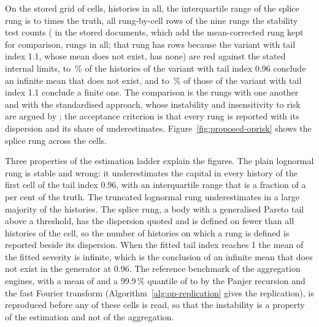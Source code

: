 On the stored grid of \pxTwelveCells{} cells, \pxTwelveHistories{} histories in all, the interquartile range of the splice rung is \pxTwelveIqrMin{} to \pxTwelveIqrMax{} times the truth, all \pxPpTwelveRed{} rung-by-cell rows of the nine rungs the stability test counts (\pxTwelveRedRows{} in the stored documents, which add the mean-corrected rung kept for comparison, \pxTwelveRungs{} rungs in all; that rung has \pxTwelveMeanCorrRows{} rows because the variant with tail index 1.1, whose mean does not exist, has none) are
red against the stated internal limits, \pxTwelveInfLow{} to \pxTwelveInfHigh{}\,\% of the histories of the variant with tail index 0.96 conclude an infinite mean that does not exist, and \pxTwelveFiniteLow{} to \pxTwelveFiniteHigh{}\,\% of
those of the variant with tail index 1.1 conclude a finite one. The comparison is the rungs with one another and with the standardised approach, whose instability and insensitivity to risk are argued by \citet{oprisk:peters2016}; the acceptance criterion
is that every rung is reported with its dispersion and its share of underestimates. Figure~\ref{fig:proposed-oprisk} shows the splice rung across the cells.

Three properties of the estimation ladder explain the figures. The plain lognormal rung is stable and wrong: it underestimates the capital in every history of the first cell of the tail index 0.96, with an interquartile range that is a fraction of a per cent of the truth.
The truncated lognormal rung underestimates in a large majority of the histories. The splice rung, a body with a generalised Pareto tail above a threshold, has the dispersion quoted and is defined on fewer than all histories of the cell, so the number of
histories on which a rung is defined is reported beside its dispersion. When the fitted tail index reaches 1 the mean of the fitted severity is infinite, which is the conclusion of an infinite mean that does not exist in the generator at 0.96. The reference
benchmark of the aggregation engines, with a mean of \pxTwelveBenchMean{} and a 99.9\,\% quantile of \pxTwelveBenchQLow{} to \pxTwelveBenchQHigh{} by the Panjer recursion and the fast Fourier transform (Algorithm~\ref{alg:op-replication} gives the replication), is reproduced before any of these cells is read, so that the instability is a property of the estimation and not of the aggregation.

